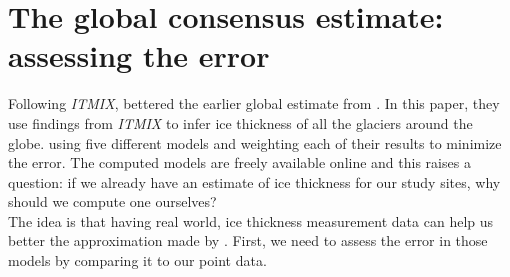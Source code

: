 \documentclass[a4, 12pt]{article}
\begin{document}
\section{The global consensus estimate: assessing the error}
Following \textit{ITMIX}, \citeauthor{farinotti2019consensus} bettered the earlier global estimate from \citeauthor{huss2012distributed} \citeyear{huss2012distributed}. In this paper, they use findings from \textit{ITMIX} to infer ice thickness of all the glaciers around the globe. using five different models and weighting each of their results to minimize the error. The computed models are freely available online and this raises a question: if we already have an estimate of ice thickness for our study sites, why should we compute one ourselves?\\ The idea is that having real world, ice thickness measurement data can help us better the approximation made by \citeauthor{farinotti2019consensus} \citeyear{farinotti2019consensus}. First, we need to assess the error in those models by comparing it to our point data.
\end{document}
